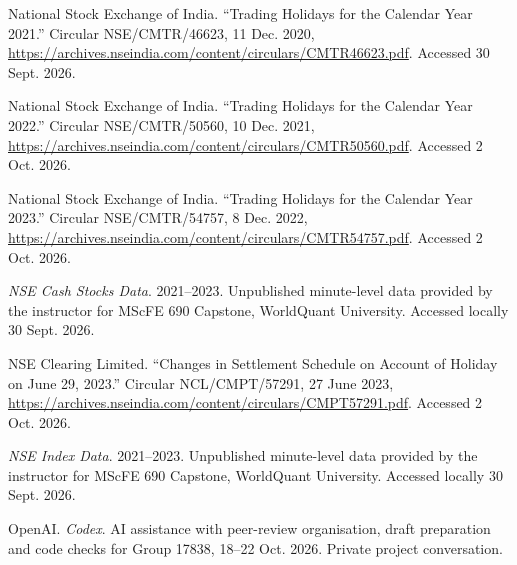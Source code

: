 \documentclass[11pt,a4paper]{article}
\begin{document}
{\RaggedRight\hangindent=1.27cm\noindent National Stock Exchange of India. “Trading Holidays for the Calendar Year 2021.” Circular NSE/CMTR/46623, 11 Dec. 2020, \url{https://archives.nseindia.com/content/circulars/CMTR46623.pdf}. Accessed 30 Sept. 2026.\par}\vspace{5pt}

{\RaggedRight\hangindent=1.27cm\noindent National Stock Exchange of India. “Trading Holidays for the Calendar Year 2022.” Circular NSE/CMTR/50560, 10 Dec. 2021, \url{https://archives.nseindia.com/content/circulars/CMTR50560.pdf}. Accessed 2 Oct. 2026.\par}\vspace{5pt}

{\RaggedRight\hangindent=1.27cm\noindent National Stock Exchange of India. “Trading Holidays for the Calendar Year 2023.” Circular NSE/CMTR/54757, 8 Dec. 2022, \url{https://archives.nseindia.com/content/circulars/CMTR54757.pdf}. Accessed 2 Oct. 2026.\par}\vspace{5pt}

{\RaggedRight\hangindent=1.27cm\noindent \textit{NSE Cash Stocks Data}. 2021--2023. Unpublished minute-level data provided by the instructor for MScFE 690 Capstone, WorldQuant University. Accessed locally 30 Sept. 2026.\par}\vspace{5pt}

{\RaggedRight\hangindent=1.27cm\noindent NSE Clearing Limited. “Changes in Settlement Schedule on Account of Holiday on June 29, 2023.” Circular NCL/CMPT/57291, 27 June 2023, \url{https://archives.nseindia.com/content/circulars/CMPT57291.pdf}. Accessed 2 Oct. 2026.\par}\vspace{5pt}

{\RaggedRight\hangindent=1.27cm\noindent \textit{NSE Index Data}. 2021--2023. Unpublished minute-level data provided by the instructor for MScFE 690 Capstone, WorldQuant University. Accessed locally 30 Sept. 2026.\par}\vspace{5pt}

{\RaggedRight\hangindent=1.27cm\noindent OpenAI. \textit{Codex}. AI assistance with peer-review organisation, draft preparation and code checks for Group 17838, 18--22 Oct. 2026. Private project conversation.\par}\vspace{5pt}
\end{document}
